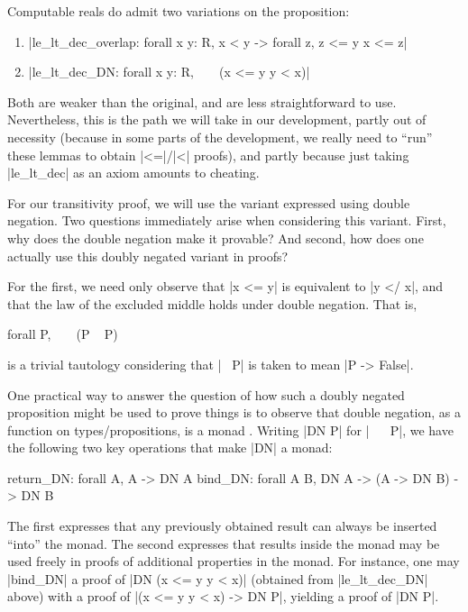 \documentclass[runningheads]{llncs}
\begin{document}
Computable reals do admit two variations on the proposition:
\begin{enumerate}
\item |le_lt_dec_overlap: forall x y: R, x < y -> forall z, z <= y \/ x <= z|
\item |le_lt_dec_DN: forall x y: R, ~ ~ (x <= y \/ y < x)|
\end{enumerate}

Both are weaker than the original, and are less straightforward to use. Nevertheless, this is the path we will take in our development, partly out of necessity (because in some parts of the development, we really need to ``run'' these lemmas to obtain |<=|/|<| proofs), and partly because just taking |le_lt_dec| as an axiom amounts to cheating. 

For our transitivity proof, we will use the variant expressed using double negation. Two questions immediately arise when considering this variant. First, why does the double negation make it provable? And second, how does one actually use this doubly negated variant in proofs?

For the first, we need only observe that |x <= y| is equivalent to |y </ x|, and that the law of the excluded middle holds under double negation. That is,
\begin{code}
  forall P, ~ ~ (P \/ ~ P)
\end{code}
is a trivial tautology considering that |~ P| is taken to mean |P -> False|.

One practical way to answer the question of how such a doubly negated proposition might be used to prove things is to observe that double negation, as a function on types/propositions, is a monad \cite{bla}. Writing |DN P| for |~ ~ P|, we have the following two key operations that make |DN| a monad:


\begin{code}
  return_DN: forall A, A -> DN A
  bind_DN: forall A B, DN A -> (A -> DN B) -> DN B
\end{code}
The first expresses that any previously obtained result can always be inserted ``into'' the monad. The second expresses that results inside the monad may be used freely in proofs of additional properties in the monad. For instance, one may |bind_DN| a proof of |DN (x <= y \/ y < x)| (obtained from |le_lt_dec_DN| above) with a proof of |(x <= y \/ y < x) -> DN P|, yielding a proof of |DN P|.
\end{document}

